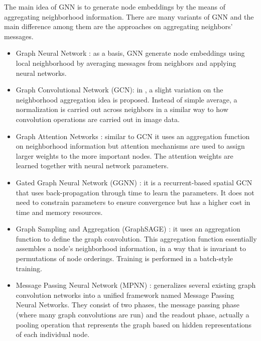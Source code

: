 \documentclass[a4paper]{article}
\begin{document}
The main idea of GNN is to generate node embeddings by the means of aggregating neighborhood information. There are many variants of GNN and the main difference among them are the approaches on aggregating neighbors' messages.  
\begin{itemize}
    \item Graph Neural Network \cite{Scarselli} \cite{Hamilton}: as a basis, GNN generate node embeddings using local neighborhood by averaging messages from neighbors and applying neural networks.
    
    \item Graph Convolutional Network (GCN): in \cite{Kipf}, a slight variation on the neighborhood aggregation idea is proposed. Instead of simple average, a normalization is carried out across neighbors in a similar way to how convolution operations are carried out in image data. 
    
    \item Graph Attention Networks \cite{velickovic2017graph}: similar to GCN it uses an aggregation function on neighborhood information but attention mechanisms are used to assign larger weights to the more important nodes. The attention weights are learned together with neural network parameters.
    
    \item Gated Graph Neural Network (GGNN) \cite{cho2014learning}: it is a recurrent-based spatial GCN that uses back-propagation through time to learn the parameters. It does not need to constrain parameters to ensure convergence but has a higher cost in time and memory resources.
    
    \item Graph Sampling and Aggregation (GraphSAGE) \cite{GraphSAGE}: it uses an aggregation function to define the graph convolution. This aggregation function essentially assembles a node's neighborhood information, in a way that is invariant to permutations of node orderings. Training is performed in a batch-style training.
    
    \item Message Passing Neural Network (MPNN)  \cite{gilmer2017neural}: generalizes several existing graph convolution networks into a unified framework named Message Passing Neural Networks. They consist of two phases, the message passing phase (where many graph convolutions are run) and the readout phase, actually a pooling operation that represents the graph based on hidden representations of each individual node.
    
    
\end{itemize}
\end{document}
